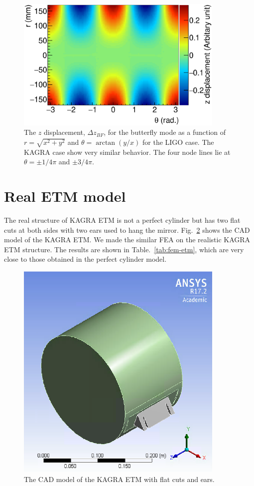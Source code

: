 \begin{figure}
\begin{center}
\includegraphics[width=10cm]{Figures/fem-bfly.eps}
\caption{The $z$ displacement, $\Delta z_{BF}$, for the butterfly mode 
as a function of $r=\sqrt{x^2+y^2}$ and $\theta=\arctan(y/x)$
for the LIGO case. The KAGRA case show very similar behavior.
The four node lines lie at $\theta=\pm1/4\pi$ and $\pm3/4\pi$.}
\label{fig:fem-bfly}
\end{center}
\end{figure}

\section{Real ETM model}

The real structure of KAGRA ETM is not a perfect cylinder but 
has two flat cuts at both sides with two ears used to hang the mirror. 
Fig.~\ref{fig:fem-etm} 
shows the CAD model of the KAGRA ETM. We made the similar FEA on the 
realistic KAGRA ETM structure. The results are shown in 
Table.~\ref{tab:fem-etm}, which are very close to those 
obtained in the perfect cylinder model.

\begin{figure}
\begin{center}
\includegraphics[width=10cm]{Figures/fem-etm.eps}
\caption{The CAD model of the KAGRA ETM with flat cuts and ears.}
\label{fig:fem-etm}
\end{center}
\end{figure}

